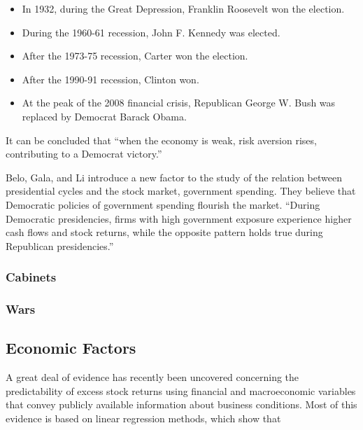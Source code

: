 \documentclass[]{book}
\providecommand{\tightlist}{%
  \setlength{\itemsep}{0pt}\setlength{\parskip}{0pt}}
\begin{document}
\begin{itemize}
\tightlist
\item
  In 1932, during the Great Depression, Franklin Roosevelt won the election.
\item
  During the 1960-61 recession, John F. Kennedy was elected.
\item
  After the 1973-75 recession, Carter won the election.
\item
  After the 1990-91 recession, Clinton won.
\item
  At the peak of the 2008 financial crisis, Republican George W. Bush was replaced by Democrat Barack Obama.
\end{itemize}

It can be concluded that ``when the economy is weak, risk aversion rises, contributing to a Democrat victory.'' \citep{pastor2017political}

Belo, Gala, and Li \citeyearpar{belo2013government} introduce a new factor to the study of the relation between presidential cycles and the stock market, government spending. They believe that Democratic policies of government spending flourish the market. ``During Democratic presidencies, firms with high government exposure experience higher cash flows and stock returns, while the opposite pattern holds true during Republican presidencies.''

\hypertarget{cabinets}{%
\subsubsection{Cabinets}\label{cabinets}}

\hypertarget{wars}{%
\subsubsection{Wars}\label{wars}}

\citep{aguiar2012cycles}

\hypertarget{economic-factors}{%
\subsection{Economic Factors}\label{economic-factors}}

A great deal of evidence has recently been uncovered concerning the predictability of excess stock returns using financial and macroeconomic variables that convey publicly available information about business conditions. Most of this evidence is based on linear regression methods, which show that
\end{document}

